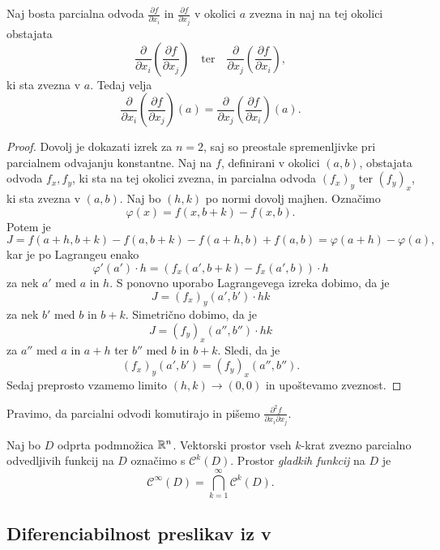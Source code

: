 
\begin{izrek}
Naj bosta parcialna odvoda $\frac{\partial f}{\partial x_i}$ in
$\frac{\partial f}{\partial x_j}$ v okolici $a$ zvezna in naj na
tej okolici obstajata
\[
\frac{\partial}{\partial x_i}\left(
	\frac{\partial f}{\partial x_j}
\right)
\quad \text{ter} \quad
\frac{\partial}{\partial x_j}\left(
	\frac{\partial f}{\partial x_i}
\right),
\]
ki sta zvezna v $a$. Tedaj velja
\[
\frac{\partial}{\partial x_i}\left(
	\frac{\partial f}{\partial x_j}
\right)(a) =
\frac{\partial}{\partial x_j}\left(
	\frac{\partial f}{\partial x_i}
\right)(a).
\]
\end{izrek}

\begin{proof}
Dovolj je dokazati izrek za $n=2$, saj so preostale spremenljivke
pri parcialnem odvajanju konstantne. Naj na $f$, definirani v
okolici $(a,b)$, obstajata odvoda $f_x,f_y$, ki sta na tej okolici
zvezna, in parcialna odvoda $(f_x)_y$ ter $(f_y)_x$, ki sta zvezna
v $(a,b)$. Naj bo $(h,k)$ po normi dovolj majhen. Označimo
\[
\varphi(x) = f(x, b+k) - f(x, b).
\]
Potem je
\[
J =
f(a+h, b+k) - f(a, b+k) - f(a+h, b) + f(a, b) =
\varphi(a+h) - \varphi(a),
\]
kar je po Lagrangeu enako
\[
\varphi'(a') \cdot h = \left(
	f_x(a', b+k) - f_x(a', b)
\right) \cdot h
\]
za nek $a'$ med $a$ in $h$. S ponovno uporabo Lagrangevega izreka
dobimo, da je
\[
J = (f_x)_y(a', b')\cdot hk
\]
za nek $b'$ med $b$ in $b+k$. Simetrično dobimo, da je
\[
J = (f_y)_x(a'', b'')\cdot hk
\]
za $a''$ med $a$ in $a+h$ ter $b''$ med $b$ in $b+k$. Sledi, da je
\[
(f_x)_y(a', b') = (f_y)_x(a'', b'').
\]
Sedaj preprosto vzamemo limito $(h, k) \to (0, 0)$ in upoštevamo
zveznost.
\end{proof}

\begin{opomba}
Pravimo, da parcialni odvodi komutirajo in pišemo
$\frac{\partial^2 f}{\partial x_i\partial x_j}$.
\end{opomba}

\begin{definicija}
Naj bo $D$ odprta podmnožica $\mathbb{R}^n$. Vektorski prostor vseh
$k$-krat zvezno parcialno odvedljivih funkcij na $D$ označimo s
$\mathcal{C}^k(D)$. Prostor
\emph{gladkih funkcij} na $D$ je
\[
\mathcal{C}^\infty(D) = \bigcap_{k=1}^\infty \mathcal{C}^k(D).
\]
\end{definicija}

\newpage

\subsection{Diferenciabilnost preslikav iz  v }

